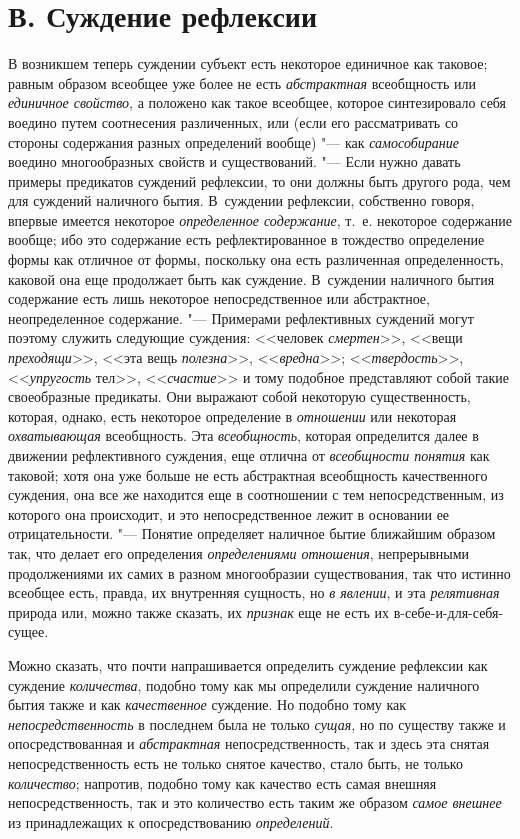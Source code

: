 {\section[В. Суждение рефлексии]{В. Суждение рефлексии}
В возникшем теперь суждении субъект есть некоторое единичное
как таковое; равным образом всеобщее уже более не есть
{\em абстрактная}
всеобщность или
{\em единичное свойство},
а положено как такое всеобщее, которое синтезировало себя
воедино путем соотнесения различенных, или (если его рассматривать со
стороны содержания разных определений вообще) "--- как
{\em самособирание}
воедино многообразных свойств и существований. "---
Если нужно давать примеры предикатов суждений рефлексии, то
они должны быть другого рода, чем для суждений наличного бытия. В~суждении
рефлексии, собственно говоря, впервые имеется некоторое
{\em определенное содержание},
т.~е. некоторое содержание вообще; ибо это содержание есть
рефлектированное в тождество определение формы как отличное от формы,
поскольку она есть различенная определенность, каковой она еще продолжает
быть как суждение. В~суждении наличного бытия содержание есть лишь
некоторое непосредственное или абстрактное, неопределенное содержание. "---
Примерами рефлективных суждений могут поэтому служить
следующие суждения: <<человек
{\em смертен}>>, <<вещи
{\em преходящи}>>, <<эта
вещь {\em полезна}>>,
<<{\em вредна}>>;
<<{\em твердость}>>,
<<{\em упругость} тел>>,
<<{\em счастие}>> и тому
подобное представляют собой такие своеобразные предикаты. Они выражают
собой некоторую существенность, которая, однако, есть некоторое определение
в {\em отношении} или
некоторая {\em охватывающая}
всеобщность. Эта
{\em всеобщность},
которая определится далее в движении рефлективного суждения,
еще отлична от {\em всеобщности
понятия} как таковой; хотя она уже больше не есть
абстрактная всеобщность качественного суждения, она все же находится еще в
соотношении с тем непосредственным, из которого она происходит, и это
непосредственное лежит в основании ее отрицательности. "---
Понятие определяет наличное бытие ближайшим образом так, что
делает его определения
{\em определениями отношения},
непрерывными продолжениями их самих в разном многообразии
существования, так что истинно всеобщее есть, правда, их внутренняя
сущность, но {\em в явлении},
и эта {\em релятивная}
природа или, можно также сказать, их
{\em признак} еще не есть
их в-себе-и-для-себя-сущее.

Можно сказать, что почти напрашивается определить суждение
рефлексии как суждение
{\em количества}, подобно
тому как мы определили суждение наличного бытия также и как
{\em качественное}
суждение. Но подобно тому как
{\em непосредственность}
в последнем была не только
{\em сущая}, но по
существу также и опосредствованная и
{\em абстрактная}
непосредственность, так и здесь эта снятая непосредственность
есть не только снятое качество, стало быть, не только
{\em количество};
напротив, подобно тому как качество есть самая внешняя
непосредственность, так и это количество есть таким же образом
{\em самое внешнее} из
принадлежащих к опосредствованию
{\em определений}.

}

